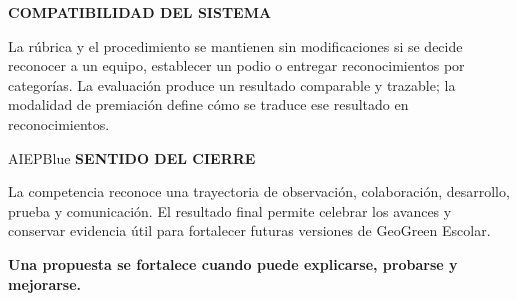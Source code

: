 \documentclass[10pt,a4paper]{article}
\newcommand{\labeltext}[1]{%
  {\scriptsize\bfseries\color{AIEPSlate}\MakeUppercase{#1}}\par\vspace{1.2mm}
}
\begin{document}
\begin{card}
\labeltext{Compatibilidad del sistema}
La rúbrica y el procedimiento se mantienen sin modificaciones si se decide reconocer a un equipo,
establecer un podio o entregar reconocimientos por categorías. La evaluación produce un resultado
comparable y trazable; la modalidad de premiación define cómo se traduce ese resultado en
reconocimientos.
\end{card}

\begin{softcard}{AIEPBlue}
\labeltext{Sentido del cierre}
La competencia reconoce una trayectoria de observación, colaboración, desarrollo, prueba y
comunicación. El resultado final permite celebrar los avances y conservar evidencia útil para
fortalecer futuras versiones de GeoGreen Escolar.
\end{softcard}

\begin{tcolorbox}[colback=AIEPNavy,colframe=AIEPNavy,arc=1.2mm,halign=center,top=3mm,bottom=3mm]
{\large\bfseries\color{White}Una propuesta se fortalece cuando puede explicarse, probarse y mejorarse.}
\end{tcolorbox}
\end{document}
